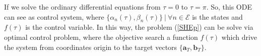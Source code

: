 
If we solve the ordinary differential equations from $\tau=0$ to $\tau=\pi$.
%
So, this ODE can see as control system, where $\{\alpha_n(\tau),\beta_n(\tau) \} \ | \ \forall n \in \mathcal{E}$ is the states and $f(\tau)$ is the control variable.
In this way, the problem (\ref{SHEp}) can be solve via optimal control problem, where the objective search a function $f(\tau)$ which drive the system from coordinates origin to the target vectors $\{ \bm{a}_T,\bm{b}_T\}$. 